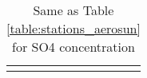 \documentclass[journal abbreviation, manuscript]{copernicus}
\begin{document}
\begin{table}
\begin{tabularx}{\textwidth}{lX}
                                                                                                                                                                                                                                                                                                                                                                                                                                                                                                                                                                                                                                                                                                                                                                                                                                                                                                                                                                                                                                                                                                                                                                                                                                                                                                                                                                                                                                                                                                                                                                                                                                                                                                                                                                                                                                                                                                                                                                                                                                                                                                                                                                                                                                                                                                                                                                                                                                                                                                                                                                                                                                                                                                                                                                                                                                                                                                                                                                                                                                                                       \\
  \bottomhline
 \end{tabularx}
 \caption{Same as Table \ref{table:stations_aerosun} for SO4 concentration}
 \label{table:stations_so4}
\end{table}
\end{document}
